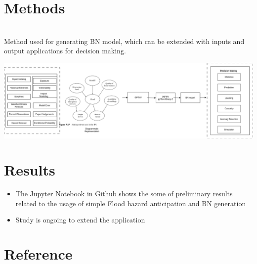 \documentclass[a0paper,fleqn]{betterposter}
\begin{document}
{		\section{Methods}
		\\ Method used for generating BN model, which can be extended with inputs and output applications for decision making.
		\begin{center}
			\includegraphics[width=\textwidth]{img/BN-model-IBF-v2.png}
		\end{center}
		
	    \section{Results}
		\begin{itemize}
			\item The Jupyter Notebook in Github shows the some of preliminary results related to the usage of simple Flood hazard anticipation and BN generation %
			\item Study is ongoing to extend the application
		\end{itemize}
		\section{Reference}
		\renewcommand{\bibsection}{}                                                                                                               
		
}
\end{document}
